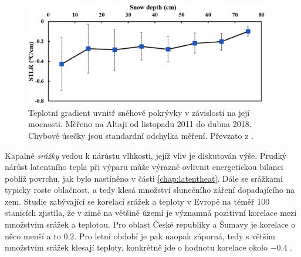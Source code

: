 \begin{figure}
	\centering
	\includegraphics[width=0.95\textwidth]{img/ch1/snowlapserate.png}
	\caption{Teplotní gradient uvnitř sněhové pokrývky v závislosti na její mocnosti. Měřeno na Altaji od listopadu 2011 do dubna 2018. Chybové úsečky jsou standardní odchylka měření. Převzato z \cite{zhangwei2021}.}
	\label{fig:snowlapserate}
\end{figure}



Kapalné \textit{srážky} vedou k nárůstu vlhkosti, jejíž vliv je diskutován výše. Prudký nárůst latentního tepla při výparu může výrazně ovlivnit energetickou bilanci poblíž povrchu, jak bylo nastíněno v části \ref{chap:latentheat}. Dále se srážkami typicky roste oblačnost, a tedy klesá množství slunečního záření dopadajícího na zem. Studie zabývající se korelací srážek a teploty v Evropě na téměř 100 stanicích zjistila, že v zimě na většině území je významná pozitivní korelace mezi množstvím srážek a teplotou. Pro oblast České republiky a Šumavy je korelace o něco menší a to $0.2$. Pro letní období je pak naopak záporná, tedy s větším množstvím srážek klesají teploty, konkrétně jde o hodnotu korelace okolo $-0.4$ \parencite{maddenroland1978}.

